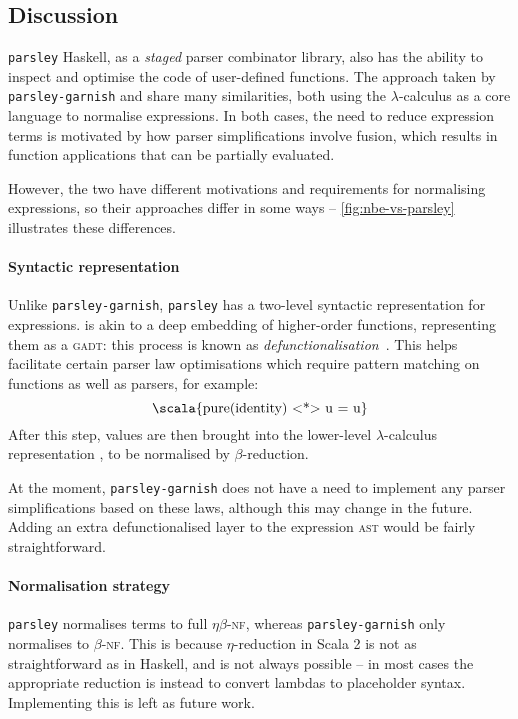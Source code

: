 \documentclass[../../../main.tex]{subfiles}
\begin{document}
\subsection*{Discussion}
\texttt{parsley} Haskell, as a \emph{staged} parser combinator library, also has the ability to inspect and optimise the code of user-defined functions.
The approach taken by \texttt{parsley-garnish} and  share many similarities, both using the $\lambda$-calculus as a core language to normalise expressions.
In both cases, the need to reduce expression terms is motivated by how parser simplifications involve fusion, which results in function applications that can be partially evaluated.

However, the two have different motivations and requirements for normalising expressions, so their approaches differ in some ways --
\cref{fig:nbe-vs-parsley} illustrates these differences.

\paragraph{Syntactic representation}
Unlike \texttt{parsley-garnish}, \texttt{parsley} has a two-level syntactic representation for expressions.
 is akin to a deep embedding of higher-order functions, representing them as a \textsc{gadt}: this process is known as \emph{defunctionalisation}~\cite{reynolds_defunc_1972,danvy_defunctionalization_2001}.
This helps facilitate certain parser law optimisations which require pattern matching on functions as well as parsers, for example:
\begin{equation*}
\text{\scala{pure(identity) <*> u = u}}
\end{equation*}
After this step,  values are then brought into the lower-level $\lambda$-calculus representation , to be normalised by $\beta$-reduction.

At the moment, \texttt{parsley-garnish} does not have a need to implement any parser simplifications based on these laws, although this may change in the future.
Adding an extra defunctionalised layer to the expression \textsc{ast} would be fairly straightforward.

\paragraph{Normalisation strategy}
\texttt{parsley} normalises terms to full $\eta\beta$-\textsc{nf}, whereas \texttt{parsley-garnish} only normalises to $\beta$-\textsc{nf}.
This is because $\eta$-reduction in Scala 2 is not as straightforward as in Haskell, and is not always possible -- in most cases the appropriate reduction is instead to convert lambdas to placeholder syntax.
Implementing this is left as future work.
\end{document}
